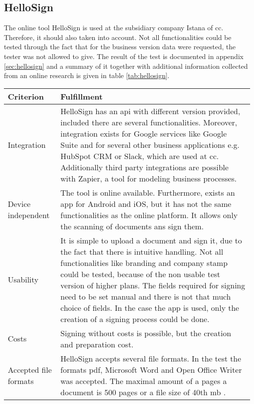 
\subsection{HelloSign}
The online tool HelloSign is used at the subsidiary company Istana of \gls{cc}. Therefore, it should also taken into account. Not all functionalities could be tested through the fact that for the business version data were requested, the tester was not allowed to give. The result of the test is documented in appendix \ref{sec:hellosign} and a summary of it together with additional information collected from an online research is given in table \ref{tab:hellosign}.
\begin{table}[h!]
	
	\begin{tabular}{|p{4cm}|p{10cm}|} \hline
		Criterion & Fulfillment \\ \hline
		Integration & HelloSign has an \gls{api} with different version provided, included there are several functionalities. Moreover, integration exists for Google services like Google Suite and for several other business applications e.g. HubSpot CRM or Slack, which are used at \gls{cc}. Additionally third party integrations are possible with Zapier, a tool for modeling business processes. \parencite{hellosign2018integration,hellosign2018api}\\ \hline
		Device independent & The tool is online available. Furthermore, exists an \gls{app} for Android and iOS, but it has not the same functionalities as the online platform. It allows only the scanning of documents ans sign them. \parencite{hellosign2018legal}\\ \hline
		Usability & It is simple to upload a document and sign it, due to the fact that there is intuitive handling. Not all functionalities like branding and company stamp could be tested, because of the non usable test version of higher plans. The fields required for signing need to be set manual and there is not that much choice of fields. In the case the \gls{app} is used, only the creation of a signing process could be done.\\ \hline
		Costs &  Signing without costs is possible, but the creation and preparation cost. \\ \hline
		Accepted file formats & HelloSign accepts several file formats. In the test the formats \gls{pdf}, Microsoft Word and Open Office Writer was accepted. The maximal amount of a pages a document is 500 pages or a file size of 40th \gls{mb} \parencite{hellosign2018documents}.\\ \hline

\end{tabular}
\end{table}
